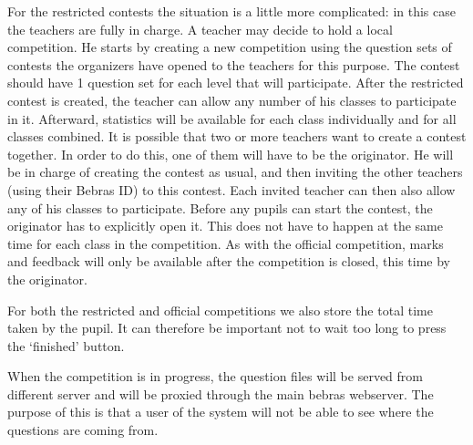 For the restricted contests the situation is a little more complicated: in this case the teachers are fully 
in charge. A teacher may decide to hold a local competition. He starts by creating a new competition using 
the question sets of contests the organizers have opened to the teachers for this purpose. The contest 
should have 1 question set for each level that will participate. After the restricted contest is created, 
the teacher can allow any number of his classes to participate in it. Afterward, statistics will be 
available for each class individually and for all classes combined. It is possible that two or more teachers 
want to create a contest together. In order to do this, one of them will have to be the originator. He will 
be in charge of creating the contest as usual, and then inviting the other teachers (using their Bebras ID) 
to this contest. Each invited teacher can then also allow any of his classes to participate. Before any 
pupils can start the contest, the originator has to explicitly open it. This does not have to happen at the 
same time for each class in the competition. As with the official competition, marks and feedback will only 
be available after the competition is closed, this time by the originator.

For both the restricted and official competitions we also store the total time taken by the pupil. It can 
therefore be important not to wait too long to press the `finished' button.     

When the competition is in progress, the question files will be served from different server and will be proxied through the main bebras webserver. The purpose of this is that a user of the system will not be able to see where the questions are coming from. 